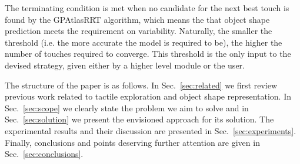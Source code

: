The terminating condition is met when no candidate for the next best touch is found by the GPAtlasRRT algorithm, which means the that object shape prediction meets the requirement on variability. Naturally, the smaller the threshold (i.e. the more accurate the model is required to be), the higher the number of touches required to converge. This threshold is the only input to the devised strategy, given either by a higher level module or the user.

The structure of the paper is as follows. In Sec.~\ref{sec:related} we first review previous work related to tactile exploration and object shape representation. In Sec.~\ref{sec:scope} we clearly state the problem we aim to solve and in Sec.~\ref{sec:solution} we present the envisioned approach for its solution. The experimental results and their discussion are presented in Sec.~\ref{sec:experiments}. Finally, conclusions and points deserving further attention are given in Sec.~\ref{sec:conclusions}.










